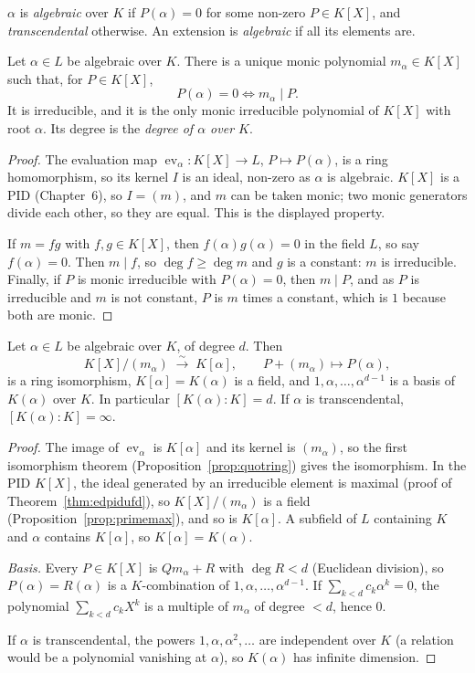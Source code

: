 \begin{definition}
$\alpha$ is \emph{algebraic} over $K$ if $P(\alpha)=0$ for some non-zero $P\in K[X]$, and \emph{transcendental} otherwise. An extension is \emph{algebraic} if all its elements are.
\end{definition}

\begin{proposition}\label{prop:minpoly}
Let $\alpha\in L$ be algebraic over $K$. There is a unique monic polynomial $m_\alpha\in K[X]$ such that, for $P\in K[X]$,
\[
P(\alpha)=0\iff m_\alpha\mid P.
\]
It is irreducible, and it is the only monic irreducible polynomial of $K[X]$ with root $\alpha$. Its degree is the \emph{degree of $\alpha$ over $K$}.
\end{proposition}
\begin{proof}
The evaluation map $\operatorname{ev}_\alpha:K[X]\to L$, $P\mapsto P(\alpha)$, is a ring homomorphism, so its kernel $I$ is an ideal, non-zero as $\alpha$ is algebraic. $K[X]$ is a PID (Chapter~6), so $I=(m)$, and $m$ can be taken monic; two monic generators divide each other, so they are equal. This is the displayed property.

If $m=fg$ with $f,g\in K[X]$, then $f(\alpha)g(\alpha)=0$ in the field $L$, so say $f(\alpha)=0$. Then $m\mid f$, so $\deg f\ge\deg m$ and $g$ is a constant: $m$ is irreducible. Finally, if $P$ is monic irreducible with $P(\alpha)=0$, then $m\mid P$, and as $P$ is irreducible and $m$ is not constant, $P$ is $m$ times a constant, which is $1$ because both are monic.
\end{proof}

\begin{theorem}\label{thm:simple}
Let $\alpha\in L$ be algebraic over $K$, of degree $d$. Then
\[
K[X]/(m_\alpha)\;\xrightarrow{\ \sim\ }\;K[\alpha],\qquad P+(m_\alpha)\mapsto P(\alpha),
\]
is a ring isomorphism, $K[\alpha]=K(\alpha)$ is a field, and $1,\alpha,\dots,\alpha^{d-1}$ is a basis of $K(\alpha)$ over $K$. In particular $[K(\alpha):K]=d$. If $\alpha$ is transcendental, $[K(\alpha):K]=\infty$.
\end{theorem}
\begin{proof}
The image of $\operatorname{ev}_\alpha$ is $K[\alpha]$ and its kernel is $(m_\alpha)$, so the first isomorphism theorem (Proposition~\ref{prop:quotring}) gives the isomorphism. In the PID $K[X]$, the ideal generated by an irreducible element is maximal (proof of Theorem~\ref{thm:edpidufd}), so $K[X]/(m_\alpha)$ is a field (Proposition~\ref{prop:primemax}), and so is $K[\alpha]$. A subfield of $L$ containing $K$ and $\alpha$ contains $K[\alpha]$, so $K[\alpha]=K(\alpha)$.

\emph{Basis.} Every $P\in K[X]$ is $Qm_\alpha+R$ with $\deg R<d$ (Euclidean division), so $P(\alpha)=R(\alpha)$ is a $K$-combination of $1,\alpha,\dots,\alpha^{d-1}$. If $\sum_{k<d}c_k\alpha^k=0$, the polynomial $\sum_{k<d}c_kX^k$ is a multiple of $m_\alpha$ of degree $<d$, hence $0$.

If $\alpha$ is transcendental, the powers $1,\alpha,\alpha^2,\dots$ are independent over $K$ (a relation would be a polynomial vanishing at $\alpha$), so $K(\alpha)$ has infinite dimension.
\end{proof}

